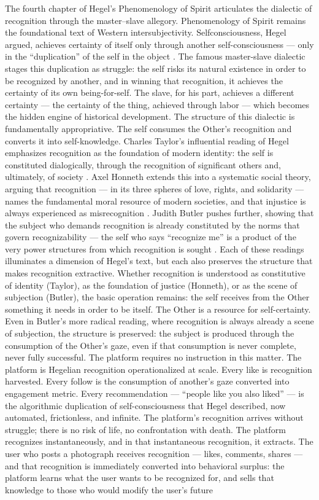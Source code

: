 The fourth chapter of Hegel's Phenomenology of Spirit articulates the dialectic of recognition through the master--slave allegory. Phenomenology of Spirit remains the foundational text of Western intersubjectivity. Selfconsciousness, Hegel argued, achieves certainty of itself only through another self-consciousness — only in the “duplication” of the self in the object \cite[pp.~104-- 119]{hegel_1807}. The famous master-slave dialectic stages this duplication as struggle: the self risks its natural existence in order to be recognized by another, and in winning that recognition, it achieves the certainty of its own being-for-self. The slave, for his part, achieves a different certainty — the certainty of the thing, achieved through labor — which becomes the hidden engine of historical development. The structure of this dialectic is fundamentally appropriative. The self consumes the Other’s recognition and converts it into self-knowledge. Charles Taylor’s influential reading of Hegel emphasizes recognition as the foundation of modern identity: the self is constituted dialogically, through the recognition of significant others and, ultimately, of society \cite{taylor_1994}. Axel Honneth extends this into a systematic social theory, arguing that recognition — in its three spheres of love, rights, and solidarity — names the fundamental moral resource of modern societies, and that injustice is always experienced as misrecognition \cite{honneth_1995}. Judith Butler pushes further, showing that the subject who demands recognition is already constituted by the norms that govern recognizability — the self who says “recognize me” is a product of the very power structures from which recognition is sought \cite{butler_2005}. Each of these readings illuminates a dimension of Hegel’s text, but each also preserves the structure that makes recognition extractive. Whether recognition is understood as constitutive of identity (Taylor), as the foundation of justice (Honneth), or as the scene of subjection (Butler), the basic operation remains: the self receives from the Other something it needs in order to be itself. The Other is a resource for self-certainty. Even in Butler’s more radical reading, where recognition is always already a scene of subjection, the structure is preserved: the subject is produced through the consumption of the Other’s gaze, even if that consumption is never complete, never fully successful. The platform requires no instruction in this matter. The platform is Hegelian recognition operationalized at scale. Every like is recognition harvested. Every follow is the consumption of another’s gaze converted into engagement metric. Every recommendation — “people like you also liked” — is the algorithmic duplication of self-consciousness that Hegel described, now automated, frictionless, and infinite. The platform’s recognition arrives without struggle; there is no risk of life, no confrontation with death. The platform recognizes instantaneously, and in that instantaneous recognition, it extracts. The user who posts a photograph receives recognition — likes, comments, shares — and that recognition is immediately converted into behavioral surplus: the platform learns what the user wants to be recognized for, and sells that knowledge to those who would modify the user’s future 